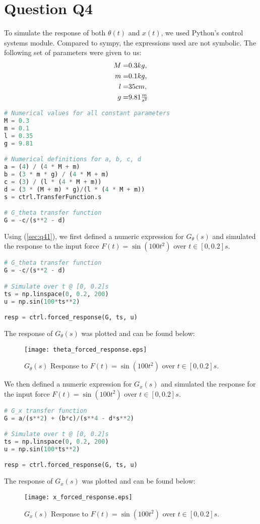 \documentclass[a4paper,10pt,reqno]{amsart}
\numberwithin{equation}{section}
\begin{document}
\section{Question Q4}
To simulate the response of both $\theta(t)$ and $x(t)$, we used Python's control systems module. Compared to sympy, the expressions used are not symbolic. The following set of parameters were given to us:
\begin{subequations}
\label{sec:q41}
\begin{align}
    M =&\space0.3kg, \\
    m =&\space0.1kg, \\
    l =&\space35cm,  \\
    g =&\space9.81\tfrac{m}{s^2}
\end{align}    
\end{subequations}
\begin{lstlisting}[language=python]
# Numerical values for all constant parameters
M = 0.3
m = 0.1
l = 0.35
g = 9.81

# Numerical definitions for a, b, c, d
a = (4) / (4 * M + m)
b = (3 * m * g) / (4 * M + m)
c = (3) / (l * (4 * M + m))
d = (3 * (M + m) * g)/(l * (4 * M + m))
s = ctrl.TransferFunction.s

# G_theta transfer function
G = -c/(s**2 - d)
\end{lstlisting}
Using (\ref{sec:q41}), we first defined a numeric expression for $G_\theta(s)$ and simulated the response to the input force $F(t)=\sin(100t^2)$ over $t\in[0, 0.2]s$.
\begin{lstlisting}[language=python]
# G_theta transfer function
G = -c/(s**2 - d)

# Simulate over t @ [0, 0.2]s
ts = np.linspace(0, 0.2, 200)
u = np.sin(100*ts**2)

resp = ctrl.forced_response(G, ts, u)
\end{lstlisting}
The response of $G_\theta(s)$ was plotted and can be found below:
\begin{figure}[h]
\centering
\texttt{[image: theta\_forced\_response.eps]}
\caption{$G_\theta(s)$ Response to $F(t)=\sin(100t^2)$ over $t\in[0, 0.2]s$.}
\end{figure}
We then defined a numeric expression for $G_x(s)$ and simulated the response for the input force $F(t)=\sin(100t^2)$ over $t\in[0, 0.2]s$.
\begin{lstlisting}[language=python]
# G_x transfer function
G = a/(s**2) + (b*c)/(s**4 - d*s**2)

# Simulate over t @ [0, 0.2]s
ts = np.linspace(0, 0.2, 200)
u = np.sin(100*ts**2)

resp = ctrl.forced_response(G, ts, u)
\end{lstlisting}
The response of $G_x(s)$ was plotted and can be found below:
\begin{figure}[h]
\centering
\texttt{[image: x\_forced\_response.eps]}
\caption{$G_x(s)$ Response to $F(t)=\sin(100t^2)$ over $t\in[0, 0.2]s$.}
\end{figure}
\end{document}
